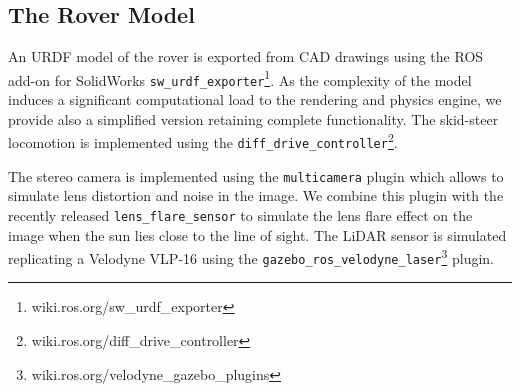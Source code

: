 \documentclass[conference]{IEEEtran}  %
\begin{document}
\subsection{The Rover Model}
An URDF model of the rover is exported from CAD drawings using the ROS add-on for SolidWorks \texttt{sw\_urdf\_exporter}\footnote{wiki.ros.org/sw\_urdf\_exporter}. As the complexity of the model induces a significant computational load to the rendering and physics engine, we provide also a simplified version retaining complete functionality. The skid-steer locomotion is implemented using the \texttt{diff\_drive\_controller}\footnote{wiki.ros.org/diff\_drive\_controller}.

The stereo camera is implemented using the \texttt{multicamera} plugin which allows to simulate lens distortion and noise in the image. We combine this plugin with the recently released \texttt{lens\_flare\_sensor} \cite{allan2019planetary} to simulate the lens flare effect on the image when the sun lies close to the line of sight.
The LiDAR sensor is simulated replicating a Velodyne VLP-16 using the \texttt{gazebo\_ros\_velodyne\_laser}\footnote{wiki.ros.org/velodyne\_gazebo\_plugins} plugin.
\end{document}
